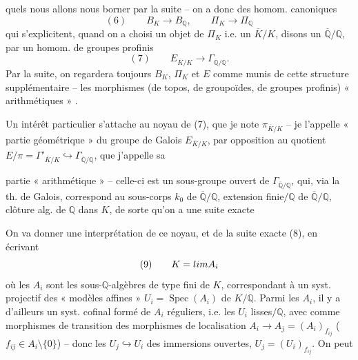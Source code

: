 \documentclass[11pt,a4paper]{article}
\begin{document}
quels nous allons nous borner par la suite -- on a donc des homom. canoniques
\[
  (6)\qquad B_K \longrightarrow B_{\mathbb{Q}}, \qquad \Pi_K \longrightarrow \Pi_{\mathbb{Q}}
\]
qui s'explicitent, quand on a choisi un objet de $\Pi_K$ i.e. un $\overline{K}/K$, disons un $\overline{\mathbb{Q}}/\mathbb{Q}$, par un homom. de groupes profinis
\[
  (7)\qquad E_{\overline{K}/K} \longrightarrow \Gamma_{\overline{\mathbb{Q}}/\mathbb{Q}} .
\]
Par la suite, on regardera toujours $B_K$, $\Pi_K$ et $E$ comme munis de cette structure supplémentaire --  les morphismes (de topos, de groupoïdes, de groupes profinis) « arithmétiques » .

Un intérêt particulier s'attache au noyau de (7), que je note $\pi_{\overline{K}/K}$ -- je l'appelle « partie géométrique » du groupe de Galois $E_{\overline{K}/K}$, par opposition au quotient $E/\pi = \Gamma'_{\overline{K}/K} \hookrightarrow \Gamma_{\overline{\mathbb{Q}}/\mathbb{Q}}$, que j'appelle sa

partie « arithmétique » -- celle-ci est un sous-groupe ouvert de $\Gamma_{\overline{\mathbb{Q}}/\mathbb{Q}}$, qui, via la th. de Galois, correspond au sous-corps $k_0$ de $\overline{\mathbb{Q}}/\mathbb{Q}$, extension finie$/\mathbb{Q}$ de $\overline{\mathbb{Q}}/\mathbb{Q}$, clôture alg. de $\mathbb{Q}$ dans $K$, de sorte qu'on a une suite exacte


On va donner une interprétation de ce noyau, et de la suite exacte (8), en écrivant
\[
  (9)\qquad K = \varinjlim A_i
\]
où les $A_i$ sont les sous-$\mathbb{Q}$-algèbres de type fini de $K$, correspondant à un syst. projectif des « modèles affines » $U_i = \operatorname{Spec}(A_i)$ de $K/\mathbb{Q}$. Parmi les $A_i$, il y a d'ailleurs un syst. cofinal formé de $A_i$ réguliers, i.e. les $U_i$ lisses$/\mathbb{Q}$, avec comme morphismes de transition des morphismes de localisation $A_i \to A_j = (A_i)_{f_{ij}}$ ($f_{ij} \in A_i \setminus \{0\}$) -- donc les $U_j \hookrightarrow U_i$ des immersions ouvertes, $U_j = (U_i)_{f_{ij}}$. On peut
\end{document}
